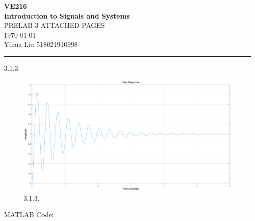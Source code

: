 \documentclass[a4paper]{article}
\begin{document}
\begin{center}
\huge
\textbf{VE216\\Introduction to Signals and Systems\\}
\Large
\vspace{30pt}
\uppercase{Prelab 3 Attached Pages}\\
\vspace{5pt}\today\\
\vspace{5pt}
Yihua Liu 518021910998
\vspace{5pt}
\rule[-10pt]{.97\linewidth}{0.05em}
\end{center}

3.1.3
\begin{figure}[H]
    \begin{center}
        \includegraphics[width=1\textwidth]{3.1.3.eps}
    \end{center}
    \caption{3.1.3.}
\end{figure}
MATLAB Code:

\end{document}
